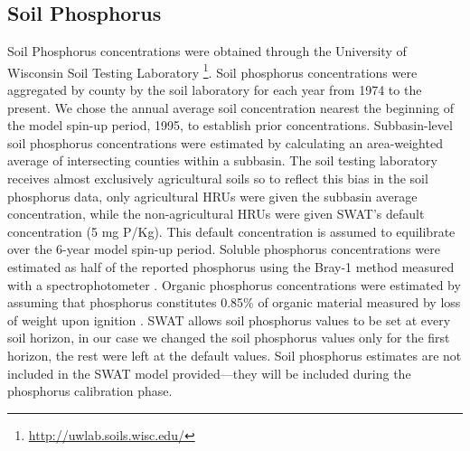 \subsection{Soil Phosphorus}\label{sec:soil_phosphorus}
Soil Phosphorus concentrations were obtained through the University of Wisconsin
Soil Testing Laboratory \footnote{\url{http://uwlab.soils.wisc.edu/}}. Soil
phosphorus concentrations were aggregated by county by the soil laboratory for
each year from 1974 to the present. We chose the annual average soil
concentration nearest the beginning of the model spin-up period, 1995, to
establish prior concentrations. Subbasin-level soil phosphorus concentrations
were estimated by calculating an area-weighted average of intersecting counties
within a subbasin.
The soil testing laboratory receives almost exclusively agricultural soils so to reflect this bias in the soil phosphorus data, only agricultural HRUs were given the subbasin average concentration, while the non-agricultural HRUs were given SWAT's default concentration (5 mg P/Kg). This default concentration is assumed to equilibrate over the 6-year model spin-up period. 
Soluble phosphorus
concentrations were estimated as half of the reported phosphorus using the
Bray-1 method measured with a spectrophotometer \citep{vadas_validating_2010}.
Organic phosphorus concentrations were estimated by assuming that phosphorus
constitutes 0.85\% of organic material measured by loss of weight upon ignition
\citep{havlin_soilfertility_2005}. 
SWAT allows soil phosphorus values to be set at every soil horizon, in our case we changed the 
soil phosphorus values only for the first horizon, the rest were left at the default values. 
Soil phosphorus estimates are not included in the SWAT model provided---they will be included during the phosphorus calibration phase.
